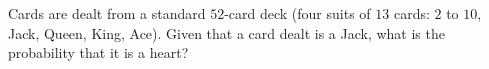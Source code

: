 Cards are dealt from a standard $52$-card deck (four suits of $13$ cards: $2$ to $10$, Jack, Queen, King, Ace). Given that a card dealt is a Jack, what is the probability that it is a heart?
